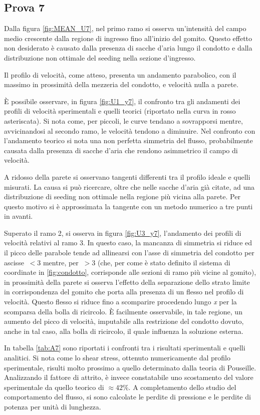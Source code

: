 \documentclass{article} %
\newcommand{\xd}{\nicefrac{\textrm{x}}{\textrm{D}}}
\begin{document}
\subsection{Prova 7}
Dalla figura \ref{fig:MEAN_U7}, nel primo ramo si osserva un'intensità del campo medio crescente dalla regione di ingresso fino all'inizio del gomito. Questo effetto non desiderato è causato dalla presenza di sacche d'aria lungo il condotto e dalla distribuzione non ottimale del seeding nella sezione d'ingresso.\par
Il profilo di velocità, come atteso, presenta un andamento parabolico, con il massimo in prossimità della mezzeria del condotto, e velocità nulla a parete.\par
È possibile osservare, in figura \ref{fig:U1_y7}, il confronto tra gli andamenti dei profili di velocità sperimentali e quelli teorici (riportato nella curva in rosso asteriscata). Si nota come, per \xd piccoli, le curve tendano a sovrapporsi mentre, avvicinandosi al secondo ramo, le velocità tendono a diminuire. Nel confronto con l'andamento teorico si nota una non perfetta simmetria del flusso, probabilmente causata dalla presenza di sacche d'aria che rendono asimmetrico il campo di velocità.\par
A ridosso della parete si osservano tangenti differenti tra il profilo ideale e quelli misurati. La causa si può ricercare, oltre che nelle sacche d'aria già citate, ad una distribuzione di seeding non ottimale nella regione più vicina alla parete. Per questo motivo si è approssimata la tangente con un metodo numerico a tre punti in avanti.\par
Superato il ramo 2, si osserva in figura \ref{fig:U3_y7}, l'andamento dei profili di velocità relativi al ramo 3. In questo caso, la mancanza di simmetria si riduce ed il picco delle parabole tende ad allinearsi con l'asse di simmetria del condotto per ascisse \xd $\ < 3$ mentre, per \xd $\ > 3$ (che, per come è stato definito il sistema di coordinate in \cref{fig:condotto}, corrisponde alle sezioni di ramo più vicine al gomito), in prossimità della parete si osserva l'effetto della separazione dello strato limite in corrispondenza del gomito che porta alla presenza di un flesso nel profilo di velocità. Questo flesso si riduce fino a scomparire procedendo lungo \textit{x} per la scomparsa della bolla di ricircolo. È facilmente osservabile, in tale regione, un aumento del picco di velocità, imputabile alla restrizione del condotto dovuto, anche in tal caso, alla bolla di ricircolo, il quale influenza la soluzione esterna.\par
In tabella \ref{tab:A7} sono riportati i confronti tra i risultati sperimentali e quelli  analitici. Si nota come lo shear stress, ottenuto numericamente dal profilo sperimentale, risulti molto prossimo a quello determinato dalla teoria di Pouseille. Analizzando il fattore di attrito, è invece constatabile uno scostamento del valore sperimentale da quello teorico di $\approx 42\%$. A completamento dello studio del comportamento del flusso, si sono calcolate le perdite di pressione e le perdite di potenza per unità di lunghezza.\par
\end{document}
